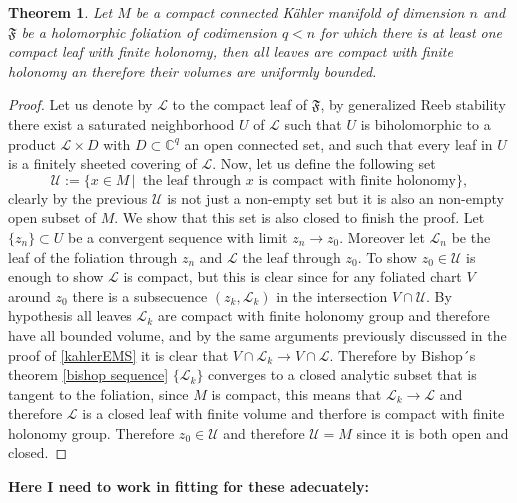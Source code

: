 \documentclass[12pt,twoside,a4paper]{report}
\newtheorem{theorem}{Theorem}[section]
\newcommand{\co}{\ensuremath{\mathbb C }}
\begin{document}
\begin{theorem}\label{compact-leaf}
Let $M$ be a compact connected K\"ahler manifold of dimension $n$ and $\mathfrak{F}$ be a holomorphic foliation of codimension $q<n$ for which there is at least one compact leaf with finite holonomy, then all leaves are compact with finite holonomy an therefore their volumes are uniformly bounded.
\end{theorem}
\begin{proof}
  Let us denote by $\mathcal L$ to the compact leaf of $\mathfrak F$, by generalized Reeb stability there exist a saturated neighborhood $U$ of $\mathcal{L}$ such that $U$ is biholomorphic to a product $\mathcal{L}\times D$ with $D\subset\co^{q}$ an open connected set, and such that every leaf in $U$ is a finitely sheeted covering of $\mathcal{L}$. Now, let us define the following set
\[
    \mathcal{U}:=\{x\in M\,\vert\, \text{ the leaf through $x$ is compact with finite holonomy}\},
\]
clearly by the previous $\mathcal{U}$ is not just a non-empty set but it is also an non-empty open subset of $M$. We show that this set is also closed to finish the proof. Let $\{z_{n}\}\subset U$ be a convergent sequence with limit $z_{n}\rightarrow z_{0}$.
Moreover let $\mathcal{L}_{n}$ be the leaf of the foliation through $z_{n}$ and $\mathcal{L}$ the leaf through $z_{0}$.
To show $z_{0}\in\mathcal{U}$ is enough to show $\mathcal{L}$ is compact, but this is clear since for any foliated chart $V$ around $z_{0}$ there is a subsecuence $(z_{k},\mathcal{L}_{k})$ in the intersection $V\cap\mathcal{U}$.
By hypothesis all leaves $\mathcal{L}_{k}$ are compact with finite holonomy group and therefore have all bounded volume, and by the same arguments previously discussed in the proof of \ref{kahlerEMS} it is clear that $V\cap\mathcal{L}_{k}\rightarrow V\cap\mathcal{L}$.
Therefore by Bishop´s theorem \ref{bishop sequence} $\{\mathcal{L}_{k}\}$ converges to a closed analytic subset that is tangent to the foliation, since $M$ is compact, this means that $\mathcal{L}_{k}\rightarrow\mathcal{L}$ and therefore $\mathcal{L}$ is a closed leaf with finite volume and therfore is compact with finite holonomy group. Therefore $z_{0}\in\mathcal{U}$ and therefore $\mathcal{U}=M$  since it is both open and closed.
\end{proof}


\LARGE\textbf{Here I need to work in fitting for these adecuately:}
\end{document}
